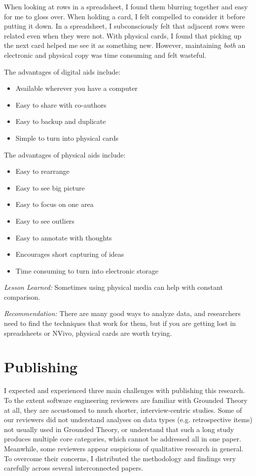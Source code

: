 When looking at rows in a spreadsheet, I found them blurring together and easy for me to gloss over. When holding a card, I felt compelled to consider it before putting it down. In a spreadsheet, I subconsciously felt that adjacent rows were related even when they were not. With physical cards, I found that picking up the next card helped me see it as something new. However, maintaining \textit{both} an electronic and physical copy was time consuming and felt wasteful.

The advantages of digital aids include:
\begin{itemize}
  \item Available wherever you have a computer
  \item Easy to share with co-authors
  \item Easy to backup and duplicate
  \item Simple to turn into physical cards
\end{itemize}

The advantages of physical aids include:
\begin{itemize}
  \item Easy to rearrange
  \item Easy to see big picture 
  \item Easy to focus on one area
  \item Easy to see outliers
  \item Easy to annotate with thoughts
  \item Encourages short capturing of ideas
  \item Time consuming to turn into electronic storage
\end{itemize}

\textit{Lesson Learned:} Sometimes using physical media can help with constant comparison. 

\textit{Recommendation:} There are many good ways to analyze data, and researchers need to find the techniques that work for them, but if you are getting lost in spreadsheets or NVivo, physical cards are worth trying.
\section{Publishing}
\label{Publishing}

I expected and experienced three main challenges with publishing this research. To the extent software engineering reviewers are familiar with Grounded Theory at all, they are accustomed to much shorter, interview-centric studies. Some of our reviewers did not understand analyses on data types (e.g. retrospective items) not usually used in Grounded Theory, or understand that such a long study produces multiple core categories, which cannot be addressed all in one paper. Meanwhile, some reviewers appear suspicious of qualitative research in general. To overcome their concerns, I distributed the methodology and findings very carefully across several interconnected papers. 

